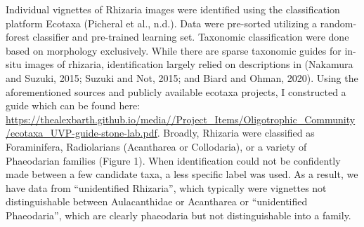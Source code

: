 \documentclass[
]{article}
\begin{document}
Individual vignettes of Rhizaria images were identified using the
classification platform Ecotaxa (Picheral et al., n.d.). Data were
pre-sorted utilizing a random-forest classifier and pre-trained learning
set. Taxonomic classification were done based on morphology exclusively.
While there are sparse taxonomic guides for in-situ images of rhizaria,
identification largely relied on descriptions in (Nakamura and Suzuki,
2015; Suzuki and Not, 2015; and Biard and Ohman, 2020). Using the
aforementioned sources and publicly available ecotaxa projects, I
constructed a guide which can be found here:
\protect\hyperlink{0}{https://thealexbarth.github.io/media//Project\_Items/Oligotrophic\_Community/ecotaxa\_UVP-guide-stone-lab.pdf}.
Broadly, Rhizaria were classified as Foraminifera, Radiolarians
(Acantharea or Collodaria), or a variety of Phaeodarian families (Figure
1). When identification could not be confidently made between a few
candidate taxa, a less specific label was used. As a result, we have
data from ``unidentified Rhizaria'', which typically were vignettes not
distinguishable between Aulacanthidae or Acantharea or ``unidentified
Phaeodaria'', which are clearly phaeodaria but not distinguishable into
a family.
\end{document}
